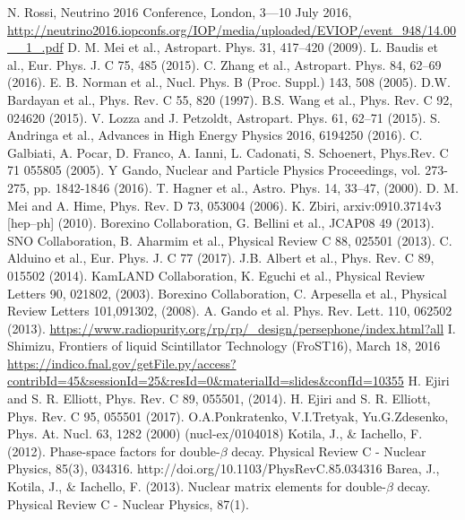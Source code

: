 \documentclass[11pt,prd,letterpaper,amsmath,amssymb,final,nofootinbib
,unsortedaddress,superscriptaddress
]{revtex4-1}
\begin{document}
\begin{thebibliography}{00}
 N. Rossi, Neutrino 2016 Conference, London, 3---10 July 2016, \url{http://neutrino2016.iopconfs.org/IOP/media/uploaded/EVIOP/event_948/14.00__1_.pdf}
 D. M. Mei et al., Astropart. Phys. 31, 417–420 (2009).
 L. Baudis et al., Eur. Phys. J. C 75, 485 (2015).
 C. Zhang et al., Astropart. Phys. 84, 62--69 (2016).
 E. B. Norman et al., Nucl. Phys. B (Proc. Suppl.) 143, 508 (2005).
 D.W. Bardayan et al., Phys. Rev. C 55, 820 (1997).
 B.S. Wang et al., Phys. Rev. C 92, 024620 (2015).
  V. Lozza and J. Petzoldt, Astropart. Phys. 61, 62--71 (2015).
 S. Andringa et al., Advances in High Energy Physics 2016, 6194250 (2016).
 C. Galbiati, A. Pocar, D. Franco, A. Ianni, L. Cadonati, S. Schoenert, Phys.Rev. C 71 055805 (2005).
 Y Gando, Nuclear and Particle Physics Proceedings, vol. 273- 275, pp. 1842-1846 (2016).
 T. Hagner et al., Astro. Phys. 14, 33--47, (2000).
 D. M. Mei and A. Hime, Phys. Rev. D 73, 053004 (2006).
 K. Zbiri, arxiv:0910.3714v3 [hep--ph] (2010).
 Borexino Collaboration, G. Bellini et al., JCAP08 49 (2013).
 SNO Collaboration, B. Aharmim et al., Physical Review C 88, 025501 (2013).
 C. Alduino et al., Eur. Phys. J. C 77 (2017).
  J.B. Albert et al., Phys. Rev. C 89, 015502 (2014). 
 KamLAND Collaboration, K. Eguchi et al., Physical Review Letters 90, 021802, (2003).
 Borexino Collaboration, C. Arpesella et al., Physical Review Letters 101,091302, (2008).
 A. Gando et al. Phys. Rev. Lett. 110, 062502 (2013).
 \url{https://www.radiopurity.org/rp/rp/_design/persephone/index.html?all}
 I. Shimizu, Frontiers of liquid Scintillator Technology (FroST16), March 18, 2016
\url{https://indico.fnal.gov/getFile.py/access?contribId=45&sessionId=25&resId=0&materialId=slides&confId=10355}
 H. Ejiri and S. R. Elliott, Phys. Rev. C 89, 055501, (2014).
 H. Ejiri and S. R. Elliott, Phys. Rev. C 95, 055501 (2017).
 O.A.Ponkratenko, V.I.Tretyak, Yu.G.Zdesenko, Phys. At. Nucl. 63, 1282   (2000)  (nucl-ex/0104018)
 Kotila, J., \& Iachello, F. (2012). Phase-space factors for double-$\beta$ decay. Physical Review C - Nuclear Physics, 85(3), 034316. http://doi.org/10.1103/PhysRevC.85.034316
 Barea, J., Kotila, J., \& Iachello, F. (2013). Nuclear matrix elements for double-$\beta$ decay. Physical Review C - Nuclear Physics, 87(1).

\end{thebibliography}




\end{document}
